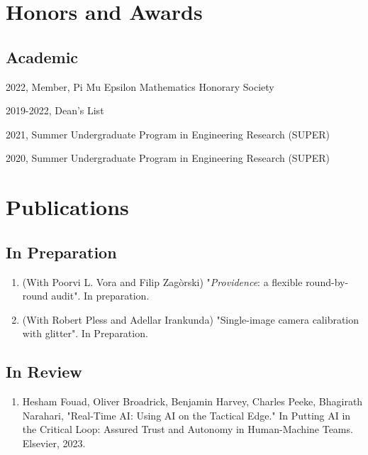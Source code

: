 \documentclass[letterpaper]{article}
\renewenvironment{itemize}{
  \begin{list}{}{
    \setlength{\leftmargin}{1.5em}
  }
}{
  \end{list}
}
\begin{document}
\section*{Honors and Awards}

\subsection*{Academic}
\begin{itemize}
\item 2022, Member, Pi Mu Epsilon Mathematics Honorary Society
\item 2019-2022, Dean's List
\item 2021, Summer Undergraduate Program in Engineering Research (SUPER)
\item 2020, Summer Undergraduate Program in Engineering Research (SUPER)
\end{itemize}


\section*{Publications}

\subsection*{In Preparation}
\begin{enumerate}
\item
(With Poorvi L. Vora and Filip Zag\`{o}rski) "\textit{Providence}: a flexible round-by-round audit". In preparation.
\item
(With Robert Pless and Adellar Irankunda) "Single-image camera calibration with glitter". In Preparation.
\end{enumerate}

\subsection*{In Review}
\begin{enumerate}
\item
Hesham Fouad, Oliver Broadrick, Benjamin Harvey, Charles Peeke, Bhagirath Narahari, "Real-Time AI: Using AI on the Tactical Edge." In Putting AI in the Critical Loop: Assured Trust and Autonomy in Human-Machine Teams. Elsevier, 2023.
\end{enumerate}
\end{document}
